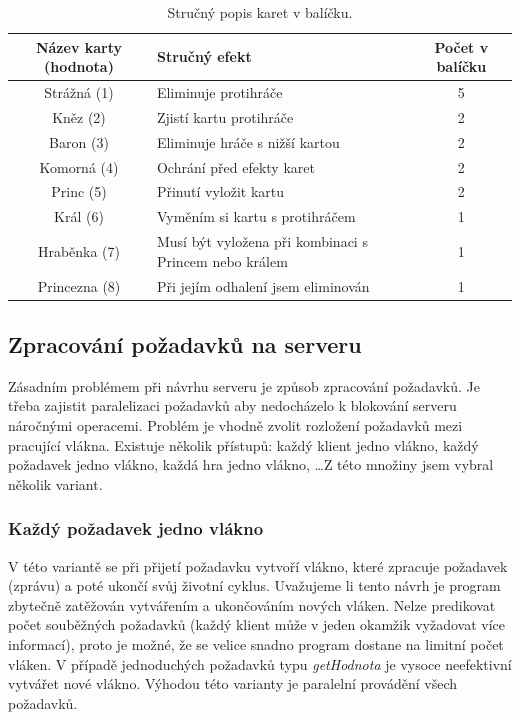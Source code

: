 \documentclass[12pt, a4paper]{article}
\begin{document}
\begin{table}[ht]
\centering
\begin{tabular}{|c | p{7cm} | c|}
\hline
Název karty (hodnota) &  Stručný efekt & Počet v balíčku\\
\hline
Strážná (1) & Eliminuje protihráče & 5\\
\hline
Kněz (2) & Zjistí kartu protihráče & 2\\
\hline
Baron (3) & Eliminuje hráče s nižší kartou & 2 \\
\hline
Komorná (4) & Ochrání před efekty karet & 2 \\
\hline
Princ (5) & Přinutí vyložit kartu & 2\\
\hline
Král (6) & Vyměním si kartu s protihráčem & 1\\
\hline
Hraběnka (7)& Musí být vyložena při kombinaci s Princem nebo králem & 1\\
\hline
Princezna (8)& Při jejím odhalení jsem eliminován & 1\\
\hline
\end{tabular}
\label{tab:karty}
\caption{Stručný popis karet v balíčku.}
\end{table}


\subsection{Zpracování požadavků na serveru}

Zásadním problémem při návrhu serveru je způsob zpracování požadavků. Je třeba zajistit paralelizaci požadavků aby nedocházelo k blokování serveru náročnými operacemi. Problém je vhodně zvolit rozložení požadavků mezi pracující vlákna. Existuje několik přístupů: každý klient jedno vlákno, každý požadavek jedno vlákno, každá hra jedno vlákno, \ldots Z této množiny jsem vybral několik variant.

\subsubsection{Každý požadavek jedno vlákno}
V této variantě se při přijetí požadavku vytvoří vlákno, které zpracuje požadavek (zprávu) a poté ukončí svůj životní cyklus. Uvažujeme li tento návrh je program zbytečně zatěžován vytvářením a ukončováním nových vláken. Nelze predikovat počet souběžných požadavků (každý klient může v jeden okamžik vyžadovat více informací), proto je možné, že se velice snadno program dostane na limitní počet vláken. V případě jednoduchých požadavků typu \emph{getHodnota} je vysoce neefektivní vytvářet nové vlákno. Výhodou této varianty je paralelní provádění všech požadavků.
\end{document}
